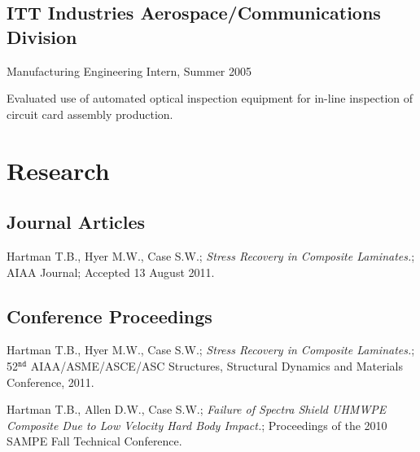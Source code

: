 \documentclass[10pt,letterpaper]{article}
\renewenvironment{itemize}{
  \begin{list}{}{
    \setlength{\leftmargin}{1.5em}
    \setlength{\itemsep}{0.25em}
    \setlength{\parskip}{0pt}
    \setlength{\parsep}{0.25em}
  }
}{
  \end{list}
}
\begin{document}
\subsection*{ITT Industries Aerospace/Communications Division}

\begin{itemize}
\item Manufacturing Engineering Intern, Summer 2005
    \begin{itemize}
    \item Evaluated use of automated optical inspection equipment for in-line inspection of circuit card assembly production.
    \end{itemize}
\end{itemize}

%
%

\section*{Research}

\subsection*{Journal Articles}
\begin{itemize}
\item Hartman T.B., Hyer M.W., Case S.W.; \textit{Stress Recovery in Composite Laminates.}; AIAA Journal; Accepted 13 August 2011.
\end{itemize}

\subsection*{Conference Proceedings}
\begin{itemize}
\item Hartman T.B., Hyer M.W., Case S.W.; \textit{Stress Recovery in Composite Laminates.}; 52$^{\texttt{nd}}$ AIAA/ASME/ASCE/ASC Structures, Structural Dynamics and Materials Conference, 2011.
\item Hartman T.B., Allen D.W., Case S.W.; \textit{Failure of Spectra Shield UHMWPE Composite Due to Low Velocity Hard Body Impact.}; Proceedings of the 2010 SAMPE Fall Technical Conference.
\end{itemize}
\end{document}
